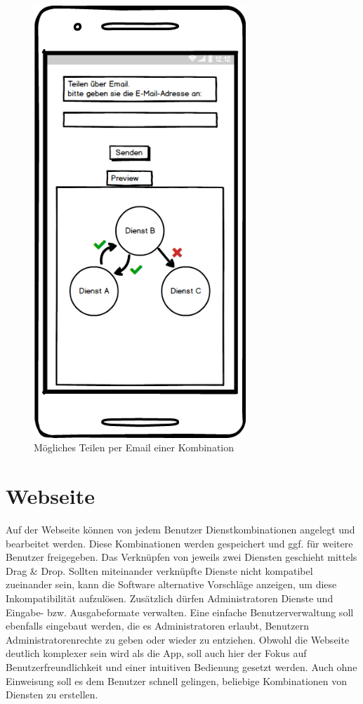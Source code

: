 \begin{figure}[ht]
	\centering
	\includegraphics[keepaspectratio,width=8cm]{img/Kombination_teilen}
	\caption{Mögliches Teilen per Email einer Kombination}
\end{figure}

\section{Webseite}
Auf der Webseite können von jedem Benutzer Dienstkombinationen angelegt und bearbeitet werden.
Diese Kombinationen werden gespeichert und ggf. für weitere Benutzer freigegeben.
Das Verknüpfen von jeweils zwei Diensten geschieht mittels Drag \& Drop.
Sollten miteinander verknüpfte Dienste nicht kompatibel zueinander sein, kann die Software alternative Vorschläge anzeigen, um diese Inkompatibilität aufzulösen.
Zusätzlich dürfen Administratoren Dienste und Eingabe- bzw. Ausgabeformate verwalten.
Eine einfache Benutzerverwaltung soll ebenfalls eingebaut werden, die es Administratoren erlaubt,
Benutzern Administratorenrechte zu geben oder wieder zu entziehen.
Obwohl die Webseite deutlich komplexer sein wird als die App, soll auch hier der Fokus auf Benutzerfreundlichkeit und einer intuitiven Bedienung gesetzt werden. Auch ohne Einweisung soll es dem Benutzer schnell gelingen, beliebige Kombinationen von Diensten zu erstellen.

